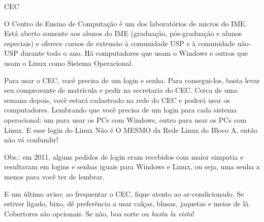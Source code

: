 \begin{secao}{CEC}

O Centro de Ensino de Computação é um dos laboratórios de micros do IME. Está
aberto somente aos alunos do IME (graduação, pós-graduação e alunos especiais)
e oferece cursos de extensão à comunidade USP e à comunidade não-USP durante
todo o ano. Há computadores que usam o Windows e outros que usam o Linux como
Sistema Operacional.

Para usar o CEC, você precisa de um login e senha. Para consegui-los, basta
levar seu comprovante de matrícula e pedir na secretaria do CEC. Cerca de uma
semana depois, você estará cadastrado na rede do CEC e poderá usar os
computadores. Lembrando que você precisa de um login para cada sistema
operacional: um para usar os PCs com Windows, outro para usar os PCs com Linux.
E esse login do Linux Não é O MESMO da Rede Linux do Bloco A, então não vá
confundir!

Obs.: em 2011, alguns pedidos de login eram recebidos com maior simpatia e
resultavam em logins e senhas iguais para Windows e Linux, ou seja, uma senha a
menos para você ter de lembrar.

E um último aviso: ao frequentar o CEC, fique atento ao ar-condicionado. Se
estiver ligado, bixo, dê preferência a usar calças, blusas, jaquetas e meias de
lã. Cobertores são opcionais. Se não, boa sorte ou \textit{hasta la vista}!

\end{secao}

